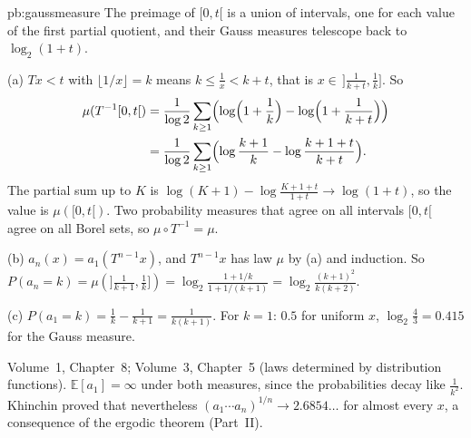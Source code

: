 \begin{solution}{pb:gaussmeasure}
\idea The preimage of $[0,t[$ is a union of intervals, one for each value of the first partial quotient, and their Gauss measures
telescope back to $\log_2(1+t)$.

\writeup (a) $Tx<t$ with $\lfloor1/x\rfloor=k$ means $k\le\frac1x<k+t$, that is $x\in\,]\frac1{k+t},\frac1k]$. So
\[
\begin{aligned}
\mu(T^{-1}[0,t[)&=\frac1{\log2}\sum_{k\ge1}\Bigl(\log\Bigl(1+\frac1k\Bigr)-\log\Bigl(1+\frac1{k+t}\Bigr)\Bigr)\\
&=\frac1{\log2}\sum_{k\ge1}\Bigl(\log\frac{k+1}k-\log\frac{k+1+t}{k+t}\Bigr).
\end{aligned}
\]
The partial sum up to $K$ is $\log(K+1)-\log\frac{K+1+t}{1+t}\to\log(1+t)$, so the value is $\mu([0,t[)$. Two probability measures that
agree on all intervals $[0,t[$ agree on all Borel sets, so $\mu\circ T^{-1}=\mu$.

(b) $a_n(x)=a_1(T^{n-1}x)$, and $T^{n-1}x$ has law $\mu$ by (a) and induction. So
$P(a_n=k)=\mu(]\frac1{k+1},\frac1k])=\log_2\frac{1+1/k}{1+1/(k+1)}=\log_2\frac{(k+1)^2}{k(k+2)}$.

(c) $P(a_1=k)=\frac1k-\frac1{k+1}=\frac1{k(k+1)}$. For $k=1$: $0.5$ for uniform $x$, $\log_2\frac43=0.415$ for the Gauss measure.

\tools Volume~1, Chapter~8; Volume~3, Chapter~5 (laws determined by distribution functions).
\leads $\mathbb E[a_1]=\infty$ under both measures, since the probabilities decay like $\frac1{k^2}$. Khinchin proved that nevertheless
$(a_1\cdots a_n)^{1/n}\to2.6854\ldots$ for almost every $x$, a consequence of the ergodic theorem (Part~II).
\end{solution}

